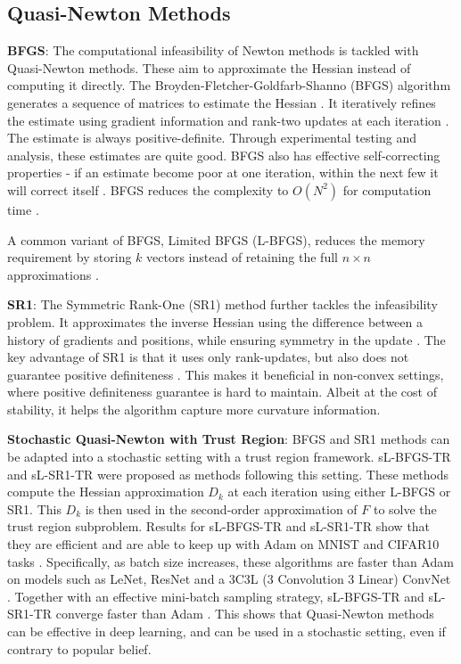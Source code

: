 \subsection{Quasi-Newton Methods}
\textbf{BFGS}: The computational infeasibility of Newton methods is tackled with Quasi-Newton methods. These aim to approximate the Hessian instead of computing it directly. The Broyden-Fletcher-Goldfarb-Shanno (BFGS) algorithm generates a sequence of matrices to estimate the Hessian \citep{NoceWrig06}. It iteratively refines the estimate using gradient information and rank-two updates at each iteration \citep{NoceWrig06}. The estimate is always positive-definite. Through experimental testing and analysis, these estimates are quite good. BFGS also has effective self-correcting properties - if an estimate become poor at one iteration, within the next few it will correct itself \citep{NoceWrig06}. BFGS reduces the complexity to $O(N^2)$ for computation time \citep{NoceWrig06, sun2019survey}.  

A common variant of BFGS, Limited BFGS (L-BFGS), reduces the memory requirement by storing $k$ vectors instead of retaining the full $n\times n$ approximations \citep{NoceWrig06, sun2019survey}.

\textbf{SR1}: The Symmetric Rank-One (SR1) method further tackles the infeasibility problem. It approximates the inverse Hessian using the difference between a history of gradients and positions, while ensuring symmetry in the update \citep{NoceWrig06}. The key advantage of SR1 is that it uses only rank-updates, but also does not guarantee positive definiteness \citep{NoceWrig06}. This makes it beneficial in non-convex settings, where positive definiteness guarantee is hard to maintain. Albeit at the cost of stability, it helps the algorithm capture more curvature information.

\textbf{Stochastic Quasi-Newton with Trust Region}: BFGS and SR1 methods can be adapted into a stochastic setting with a trust region framework. sL-BFGS-TR and sL-SR1-TR were proposed as methods following this setting. These methods compute the Hessian approximation $D_k$ at each iteration using either L-BFGS or SR1. This $D_k$ is then used in the second-order approximation of $F$ to solve the trust region subproblem. Results for sL-BFGS-TR and sL-SR1-TR show that they are efficient and are able to keep up with Adam on MNIST and CIFAR10 tasks \citep{yousefi2023deep}. Specifically, as batch size increases, these algorithms are faster than Adam on models such as LeNet, ResNet and a 3C3L (3 Convolution 3 Linear) ConvNet \citep{yousefi2023deep}. Together with an effective mini-batch sampling strategy, sL-BFGS-TR and sL-SR1-TR converge faster than Adam \citep{yousefi2023deep}. This shows that Quasi-Newton methods can be effective in deep learning, and can be used in a stochastic setting, even if contrary to popular belief.

